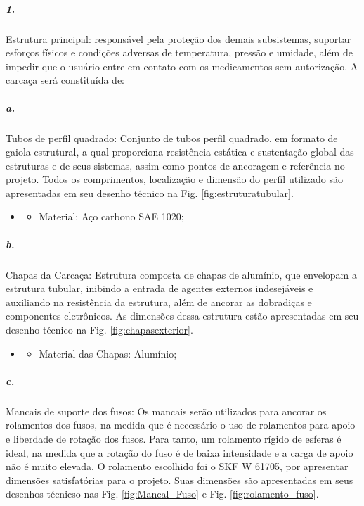     
\subparagraph*{1.}
Estrutura principal: responsável pela proteção dos demais subsistemas, suportar esforços físicos e condições adversas de temperatura, pressão e umidade, além de impedir que o usuário entre em contato com os medicamentos sem autorização. A carcaça será constituída de:

    \subparagraph*{a. } \label{retorno_tubos_perfilquadrado}
    Tubos de perfil quadrado:  Conjunto de tubos perfil quadrado, em formato de gaiola estrutural, a qual proporciona resistência estática e sustentação global das estruturas e de seus sistemas, assim como pontos de ancoragem e referência no projeto. Todos os comprimentos, localização e dimensão do perfil utilizado são apresentadas em seu desenho técnico na Fig. \ref{fig:estruturatubular}.
   \begin{itemize}
   \item[]
   \begin{itemize}
      \item Material: Aço carbono SAE 1020;
   \end{itemize}
   \end{itemize}
     
    \subparagraph*{b. }  \label{retorno_chapas} 
    Chapas da Carcaça: Estrutura composta de chapas de alumínio, que envelopam a estrutura tubular, inibindo a entrada de agentes externos indesejáveis e auxiliando na resistência da estrutura, além de ancorar as dobradiças e componentes eletrônicos. As dimensões dessa estrutura estão apresentadas em seu desenho técnico na Fig. \ref{fig:chapasexterior}.
   \begin{itemize}
   \item[]
   \begin{itemize}
       \item Material das Chapas: Alumínio;
   \end{itemize}
   \end{itemize}
    
     
    \subparagraph*{c.} \label{Retorno_Mancal_de_suporte} 
    Mancais de suporte dos fusos: Os mancais serão utilizados para ancorar os rolamentos dos fusos, na medida que é necessário o uso de rolamentos para apoio e liberdade de rotação dos fusos. Para tanto, um rolamento rígido de esferas é ideal, na medida que a rotação do fuso é de baixa intensidade e a carga de apoio não é muito elevada. O rolamento escolhido foi o SKF W 61705, por apresentar dimensões satisfatórias para o projeto.   Suas dimensões são apresentadas em seus desenhos técnicso nas Fig. \ref{fig:Mancal_Fuso} e Fig. \ref{fig:rolamento_fuso}.
    
